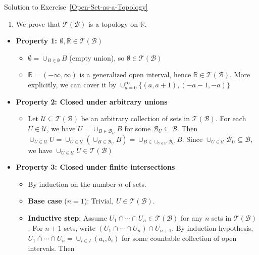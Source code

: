 \begin{mystsolution}{Solution to Exercise~\ref{Open-Set-as-a-Topology}}\begin{enumerate}
\item We prove that $\mathcal{T}(\mathcal{B})$ is a topology on $\mathbb{R}$.
\end{enumerate}

\begin{itemize}
\item \textbf{Property 1: $\emptyset, \mathbb{R} \in \mathcal{T}(\mathcal{B})$}

\begin{itemize}
\item $\emptyset = \cup_{B \in \emptyset} B$ (empty union), so $\emptyset \in \mathcal{T}(\mathcal{B})$
\item $\mathbb{R} = ( -\infty, \infty)$ is a generalized open interval, hence $\mathbb{R} \in \mathcal{T}(\mathcal{B})$. More explicitly, we can cover it by $\cup_{a=0}^{\infty} \{(a,a+1),( -a -1, -a)\}$
\end{itemize}


\item \textbf{Property 2: Closed under arbitrary unions}

\begin{itemize}
\item Let $\mathcal{U} \subseteq \mathcal{T}(\mathcal{B})$ be an arbitrary collection of sets in $\mathcal{T}(\mathcal{B})$. For each $U \in \mathcal{U}$, we have $U = \cup_{B \in \mathcal{B}_U} B$ for some $\mathcal{B}_U \subseteq \mathcal{B}$. Then $\cup_{U \in \mathcal{U}} U = \cup_{U \in \mathcal{U}} \left(\cup_{B \in \mathcal{B}_U} B\right) = \cup_{B \in \cup_{U \in \mathcal{U}} \mathcal{B}_U} B$. Since $\cup_{U \in \mathcal{U}} \mathcal{B}_U \subseteq \mathcal{B}$, we have $\cup_{U \in \mathcal{U}} U \in \mathcal{T}(\mathcal{B})$
\end{itemize}


\item \textbf{Property 3: Closed under finite intersections}

\begin{itemize}
\item By induction on the number $n$ of sets.
\item \textbf{Base case} ($n=1$): Trivial, $U \in \mathcal{T}(\mathcal{B})$.
\item \textbf{Inductive step}: Assume $U_1 \cap \cdots \cap U_n \in \mathcal{T}(\mathcal{B})$ for any $n$ sets in $\mathcal{T}(\mathcal{B})$.
For $n+1$ sets, write $(U_1 \cap \cdots \cap U_n) \cap U_{n+1}$. By induction hypothesis, $U_1 \cap \cdots \cap U_n = \cup_{i \in I}(a_i, b_i)$
for some countable collection of open intervals. Then


\end{itemize}
\end{itemize}
\end{mystsolution}
